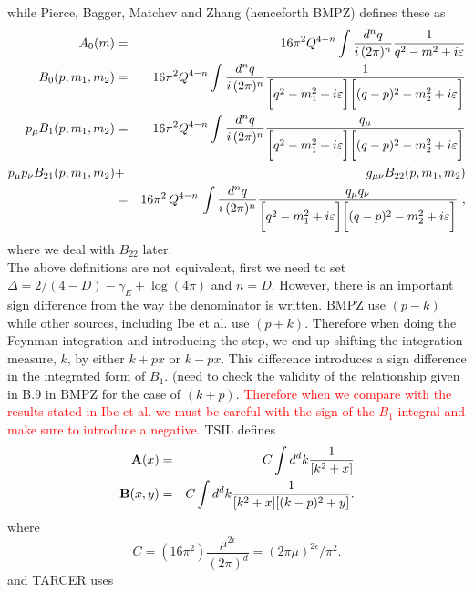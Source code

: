\documentclass[11pt]{article}
\newcommand{\tsil}{\textsf{TSIL} }
\newcommand{\tarcer}{\textsf{TARCER} }
\begin{document}
while Pierce, Bagger, Matchev and Zhang \cite{Pierce1996} (henceforth BMPZ) defines these as
\begin{eqnarray}
A_0(m) &=& 16\pi^2Q^{4-n}\int{d^nq\over i\,(2\pi)^n}{1\over
q^2-m^2+i\varepsilon}\\
B_0(p, m_1, m_2) &=&
16\pi^2Q^{4-n}\int{d^nq\over i\,(2\pi)^n}
{1\over\biggl[q^2-m^2_1+i\varepsilon\biggr]\biggl[
(q-p)^2-m_2^2+i\varepsilon\biggr]}
\label{B0 def}  \\
p_\mu B_1(p, m_1,m_2) &=& 16\pi^2Q^{4-n}\int
{d^nq\over i\,(2\pi)^n}{q_\mu\over\biggl[q^2-m^2_1+i\varepsilon\biggr]
\biggl[(q-p)^2-m_2^2+i\varepsilon\biggr]}\label{B1 def} \\ p_\mu p_\nu
B_{21}(p,m_1,m_2) &+& g_{\mu\nu}B_{22}(p,m_1,m_2)
\label{B22 def}\\
 &=& 16\pi^2\,Q^{4-n}\,\int{d^nq\over i\,(2\pi)^n} {q_\mu
q_\nu\over\biggl[q^2-m^2_1+i\varepsilon\biggr]\biggl[
(q-p)^2-m_2^2+i\varepsilon\biggr]}\ , \nonumber
\end{eqnarray}
where we deal with $B_{22}$ later.\\  

The above definitions are not equivalent, first we need to set $\Delta = 2/(4-D)-\gamma_E+\log(4\pi)$ and $n=D$.  However, there is an important sign difference from the way the denominator is written.  BMPZ use $(p-k)$ while other sources, including Ibe et al. use $(p+k)$.  Therefore when doing the Feynman integration and introducing the step, we end up shifting the integration measure, $k$, by either $k+px$ or $k-px$.  This difference introduces a sign difference in the integrated form of $B_1$.  (need to check the validity of the relationship given in B.9 in BMPZ for the case of $(k+p)$.  \textcolor{red}{Therefore when we compare with the results stated in Ibe et al. we must be careful with the sign of the $B_1$ integral and make sure to introduce a negative.}
\tsil defines
\begin{eqnarray}
{\bf A}(x) &=&  
C \int d^d k \frac{1}{[k^2 +x]}  %
\label{defineboldA}
\\
{\bf B}(x,y) &=&
C \int d^d k   \frac{1}{[k^2 +x] [(k-p)^2 +y]} .
\label{defineboldB}
\end{eqnarray}
where
\begin{equation}
C = (16 \pi^2) \frac{\mu^{2\epsilon}}{(2 \pi)^d}
  = (2 \pi \mu)^{2 \epsilon}/\pi^2 .
\end{equation}
and \tarcer uses
\end{document}
